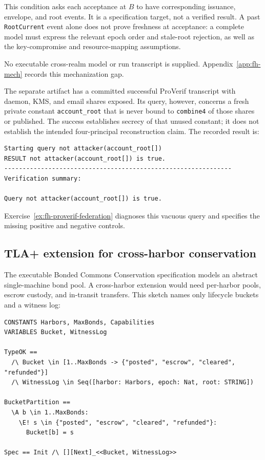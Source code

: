 \documentclass[11pt,a4paper]{article}
\theoremstyle{definition}
\theoremstyle{remark}
\begin{document}
This condition asks each acceptance at $B$ to have corresponding issuance, envelope, and root events. It is a specification target, not a verified result. A past \texttt{RootCurrent} event alone does not prove freshness at acceptance: a complete model must express the relevant epoch order and stale-root rejection, as well as the key-compromise and resource-mapping assumptions.

No executable cross-realm model or run transcript is supplied. Appendix~\ref{app:fh-mech} records this mechanization gap.

The separate artifact  has a committed successful ProVerif transcript with daemon, KMS, and email shares exposed. Its query, however, concerns a fresh private constant \texttt{account\_root} that is never bound to \texttt{combine4} of those shares or published. The success establishes secrecy of that unused constant; it does not establish the intended four-principal reconstruction claim. The recorded result is:
\begin{lstlisting}[caption={\texttt{proofs/bonded/federated/federated.pv}, actual ProVerif output},style=proverif]
Starting query not attacker(account_root[])
RESULT not attacker(account_root[]) is true.
--------------------------------------------------------------
Verification summary:

Query not attacker(account_root[]) is true.
\end{lstlisting}
Exercise~\ref{ex:fh-proverif-federation} diagnoses this vacuous query and specifies the missing positive and negative controls.

\pdexercisepointerone{\ref{ex:fh-proverif-federation}}{\pageref{ex:fh-proverif-federation}}

\subsection{TLA+ extension for cross-harbor conservation}\label{sec:fh-tla-ext}

The executable Bonded Commons Conservation specification models an abstract single-machine bond pool. A cross-harbor extension would need per-harbor pools, escrow custody, and in-transit transfers. This sketch names only lifecycle buckets and a witness log:

\begin{lstlisting}[caption={Cross-Harbor Conservation specification (sketch)},style=tlaplus]
CONSTANTS Harbors, MaxBonds, Capabilities
VARIABLES Bucket, WitnessLog

TypeOK ==
  /\ Bucket \in [1..MaxBonds -> {"posted", "escrow", "cleared", "refunded"}]
  /\ WitnessLog \in Seq([harbor: Harbors, epoch: Nat, root: STRING])

BucketPartition ==
  \A b \in 1..MaxBonds:
    \E! s \in {"posted", "escrow", "cleared", "refunded"}:
      Bucket[b] = s

Spec == Init /\ [][Next]_<<Bucket, WitnessLog>>
\end{lstlisting}
\end{document}
